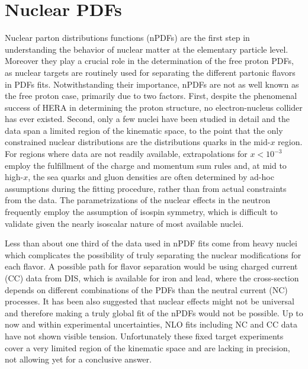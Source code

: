 
\section{Nuclear PDFs\label{sec:nPDFs}}
%
Nuclear parton distributions functions (nPDFs) are the first step in understanding the behavior of nuclear matter at the elementary particle level. Moreover they play a crucial role in the determination of the free proton PDFs, as nuclear targets are routinely used for separating the different partonic flavors in PDFs fits. Notwithstanding their importance, nPDFs are not as well known as the free proton case, primarily due to two factors. First, despite the phenomenal success of HERA in determining the proton structure, no electron-nucleus collider has ever existed. Second, only a few nuclei have been studied in detail and the data span a limited region of the kinematic space, to the point that the only constrained nuclear distributions are the distributions quarks in the mid-$x$ region.  For regions where data are not readily available, extrapolations for $x < 10^{-3}$ employ the fulfillment of the charge and momentum sum rules and, at mid to high-$x$, the sea quarks and gluon densities are often determined by ad-hoc assumptions during the fitting procedure, rather than from actual constraints from the data.  The parametrizations of the nuclear effects in the neutron frequently employ the assumption of isospin symmetry, which is difficult to validate given the nearly isoscalar nature of most available nuclei.

Less than about one third of the data used in nPDF fits come from heavy nuclei which complicates the possibility of truly separating the nuclear modifications for each flavor. A possible path for flavor separation would be using charged current (CC) data from DIS, which is available for iron and lead, where the cross-section depends on different combinations of the PDFs than the neutral current (NC) processes. It has been also suggested that nuclear effects might not be universal and therefore making a truly global fit of the nPDFs would not be possible. Up to now and within experimental uncertainties, NLO fits including NC and CC data have not shown visible tension. Unfortunately these fixed target experiments cover a very limited region of the kinematic space and are lacking in precision, not allowing yet for a conclusive answer.


